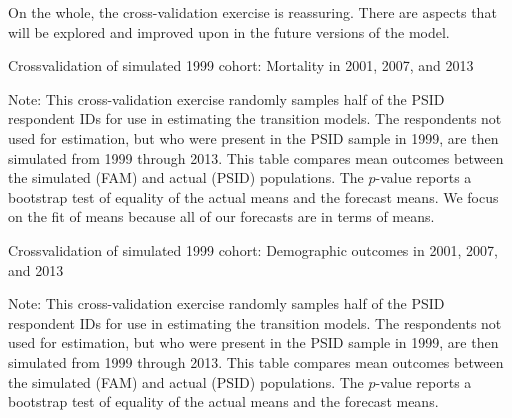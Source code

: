 \noindent On the whole, the cross-validation exercise is reassuring. There are aspects that will be explored and improved upon in the future versions of the model.

\begin{table}[H]
\begin{threeparttable}
\caption{Crossvalidation of simulated 1999 cohort: Mortality in 2001, 2007, and 2013}
\label{table:crossval_unweighted}
\centering
\footnotesize

\begin{tablenotes}
\footnotesize
\item Note: This cross-validation exercise randomly samples half of the PSID respondent IDs for use in estimating the transition models. The respondents not used for estimation, but who were present in the PSID sample in 1999, are then simulated from 1999 through 2013. This table compares mean outcomes between the simulated (FAM) and actual (PSID) populations. The $p$-value reports a bootstrap test of equality of the actual means and the forecast means. We focus on the fit of means because all of our forecasts are in terms of means.
\end{tablenotes}
\end{threeparttable}
\end{table}

\begin{table}[H]
\begin{threeparttable}
\caption{Crossvalidation of simulated 1999 cohort: Demographic outcomes in 2001, 2007, and 2013}
\label{table:crossval_demog}
\centering
\footnotesize

\begin{tablenotes}
\footnotesize
\item Note: This cross-validation exercise randomly samples half of the PSID respondent IDs for use in estimating the transition models. The respondents not used for estimation, but who were present in the PSID sample in 1999, are then simulated from 1999 through 2013. This table compares mean outcomes between the simulated (FAM) and actual (PSID) populations. The $p$-value reports a bootstrap test of equality of the actual means and the forecast means.
\end{tablenotes}
\end{threeparttable}
\end{table}

